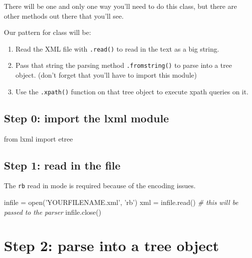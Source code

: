 \documentclass[11pt]{article}
\providecommand{\tightlist}{%
      \setlength{\itemsep}{0pt}\setlength{\parskip}{0pt}}
\newenvironment{Shaded}{}{}
\newcommand{\StringTok}[1]{\textcolor[rgb]{0.25,0.44,0.63}{{#1}}}
\newcommand{\CommentTok}[1]{\textcolor[rgb]{0.38,0.63,0.69}{\textit{{#1}}}}
\newcommand{\NormalTok}[1]{{#1}}
\newcommand{\ImportTok}[1]{{#1}}
\newcommand{\OperatorTok}[1]{\textcolor[rgb]{0.40,0.40,0.40}{{#1}}}
\newcommand{\BuiltInTok}[1]{{#1}}
\begin{document}
There will be one and only one way you'll need to do this class, but
there are other methods out there that you'll see.

Our pattern for class will be:

\begin{enumerate}
\def\labelenumi{\arabic{enumi}.}
\tightlist
\item
  Read the XML file with \texttt{.read()} to read in the text as a big
  string.
\item
  Pass that string the parsing method \texttt{.fromstring()} to parse
  into a tree object. (don't forget that you'll have to import this
  module)
\item
  Use the \texttt{.xpath()} function on that tree object to execute
  xpath queries on it.
\end{enumerate}

\subsection{Step 0: import the lxml
module}\label{step-0-import-the-lxml-module}

\begin{Shaded}
\begin{Highlighting}[]
\ImportTok{from}\NormalTok{ lxml }\ImportTok{import}\NormalTok{ etree}
\end{Highlighting}
\end{Shaded}

\subsection{Step 1: read in the file}\label{step-1-read-in-the-file}

The \texttt{rb} read in mode is required because of the encoding issues.

\begin{Shaded}
\begin{Highlighting}[]
\NormalTok{infile }\OperatorTok{=}  \BuiltInTok{open}\NormalTok{(}\StringTok{'YOURFILENAME.xml'}\NormalTok{, }\StringTok{'rb'}\NormalTok{)}
\NormalTok{xml }\OperatorTok{=}\NormalTok{ infile.read() }\CommentTok{# this will be passed to the parser}
\NormalTok{infile.close()}
\end{Highlighting}
\end{Shaded}

\section{Step 2: parse into a tree
object}\label{step-2-parse-into-a-tree-object}
\end{document}
